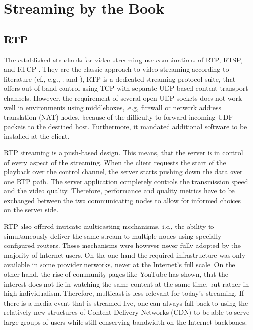 

\section{Streaming by the Book}
\subsection{RTP}


The established standards for video streaming use combinations of RTP, RTSP, and RTCP \cite{rfc3550, rfc2326}. They are the classic approach to video streaming according to literature (cf., e.g., \cite[p.~589ff]{kurose2008computer}, and \cite[p.~426ff]{peterson2007computer}),  RTP is a dedicated streaming protocol suite, that offers out-of-band control using TCP with separate UDP-based content transport channels. However, the requirement of several open UDP sockets does not work well in environments using middleboxes, .e.g, firewall or network address translation (NAT) nodes, because of the difficulty to forward incoming UDP packets to the destined host. Furthermore, it mandated additional software to be installed at the client. 

RTP streaming is a push-based design. This means, that the server is in control of every aspect of the streaming. When the client requests the start of the playback over the control channel, the server starts pushing down the data over one RTP path. The server application completely controls the transmission speed and the video quality. Therefore, performance and quality metrics have to be exchanged between the two communicating nodes to allow for informed choices on the server side.

RTP also offered intricate multicasting mechanisms, i.e., the ability to simultaneously deliver the same stream to multiple nodes using specially configured routers. These mechanisms were however never fully adopted by the majority of Internet users. On the one hand the required infrastructure was only available in some provider networks, never at the Internet's full scale. On the other hand, the rise of community pages like YouTube has shown, that the interest does not lie in watching the same content at the same time, but rather in high individualism. Therefore, multicast is less relevant for today's streaming. If there is a media event that is streamed live, one can always fall back to using the relatively new structures of Content Delivery Networks (CDN) to be able to serve large groups of users while still conserving bandwidth on the Internet backbones.

